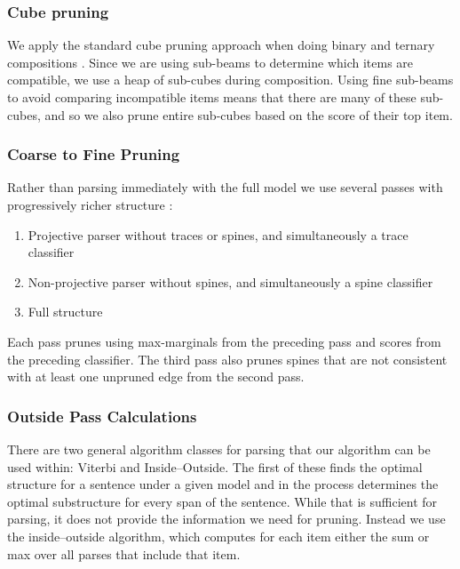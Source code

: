 \subsubsection{Cube pruning}

We apply the standard cube pruning approach when doing binary and ternary compositions \parencite{Chiang:2007}.
Since we are using sub-beams to determine which items are compatible, we use a heap of sub-cubes during composition.
Using fine sub-beams to avoid comparing incompatible items means that there are many of these sub-cubes, and so we also prune entire sub-cubes based on the score of their top item.

\subsubsection{Coarse to Fine Pruning}

Rather than parsing immediately with the full model we use several passes with progressively richer structure \parencite{Goodman:1997}:

\begin{enumerate}
  \item Projective parser without traces or spines, and simultaneously a trace classifier
  \item Non-projective parser without spines, and simultaneously a spine classifier
  \item Full structure
\end{enumerate}

Each pass prunes using max-marginals from the preceding pass and scores from the preceding classifier.
The third pass also prunes spines that are not consistent with at least one unpruned edge from the second pass.

\subsubsection{Outside Pass Calculations}

There are two general algorithm classes for parsing that our algorithm can be used within: Viterbi and Inside--Outside.
The first of these finds the optimal structure for a sentence under a given model and in the process determines the optimal substructure for every span of the sentence.
While that is sufficient for parsing, it does not provide the information we need for pruning.
Instead we use the inside--outside algorithm, which computes for each item either the sum or max over all parses that include that item.

